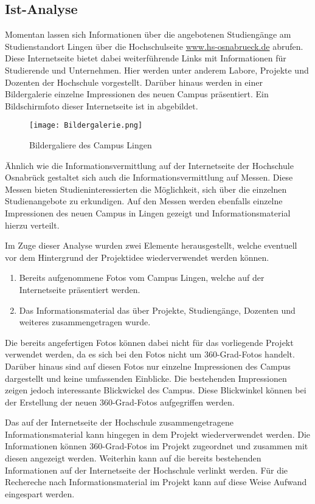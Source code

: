 \subsection{Ist-Analyse}
\label{sec:IstAnalyse}

Momentan lassen sich Informationen über die angebotenen Studiengänge am
Stu\-di\-en\-stand\-ort Lingen über die Hochschulseite
\url{www.hs-osnabrueck.de} abrufen. Diese Internetseite bietet dabei
weiterführende Links mit Informationen für Studierende und Unternehmen. Hier
werden unter anderem Labore, Projekte und Dozenten der Hochschule vorgestellt.
Darüber hinaus werden in einer Bildergalerie einzelne Impressionen des neuen
Campus präsentiert. Ein Bildschirmfoto dieser Internetseite ist in
 abgebildet.

\begin{figure}[htb]
\centering
\texttt{[image: Bildergalerie.png]}
\caption[Bildergalerie des Campus Lingen]{Bildergaliere des Campus Lingen\protect\footnotemark}
\label{fig:Bildergalerie}
\end{figure}

Ähnlich wie die Informationsvermittlung auf der Internetseite der Hochschule
Osnabrück gestaltet sich auch die Informationsvermittlung auf Messen. Diese
Messen bieten Studieninteressierten die Möglichkeit, sich über die einzelnen
Studienangebote zu erkundigen. Auf den Messen werden ebenfalls einzelne
Impressionen des neuen Campus in Lingen gezeigt und Informationsmaterial hierzu
verteilt.

Im Zuge dieser Analyse wurden zwei Elemente herausgestellt, welche eventuell vor
dem Hintergrund der Projektidee wiederverwendet werden können.

\begin{enumerate}
  \item Bereits aufgenommene Fotos vom Campus Lingen, welche auf der
  Internetseite präsentiert werden.
  \item Das Informationsmaterial das über Projekte, Studiengänge, Dozenten und
  weiteres zusammengetragen wurde.
\end{enumerate}

Die bereits angefertigen Fotos können dabei nicht für das vorliegende Projekt
verwendet werden, da es sich bei den Fotos nicht um 360-Grad-Fotos handelt.
Darüber hinaus sind auf diesen Fotos nur einzelne Impressionen des Campus
dargestellt und keine umfassenden Einblicke. Die bestehenden Impressionen
zeigen jedoch interessante Blickwickel des Campus. Diese Blickwinkel können bei
der Erstellung der neuen 360-Grad-Fotos aufgegriffen werden.

Das auf der Internetseite der Hochschule zusammengetragene Informationsmaterial
kann hingegen in dem Projekt wiederverwendet werden. Die Informationen können
360-Grad-Fotos im Projekt zugeordnet und zusammen mit diesen angezeigt werden.
Weiterhin kann auf die bereits bestehenden Informationen auf der Internetseite
der Hochschule verlinkt werden. Für die Rechereche nach Informationsmaterial im
Projekt kann auf diese Weise Aufwand eingespart werden.